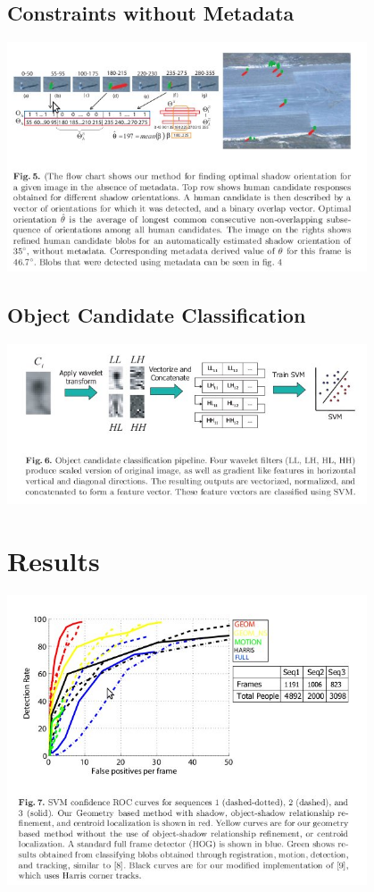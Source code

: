 \documentclass{beamer}
\begin{document}
\subsection{Constraints without Metadata}

\begin{frame}
	\includegraphics[width=0.8\textwidth]{img/fig5.jpg}
\end{frame}

\subsection{Object Candidate Classification}

\begin{frame}
	\includegraphics[width=0.8\textwidth]{img/fig6.jpg}
\end{frame}

\section{Results}

\begin{frame}
	\includegraphics[width=0.8\textwidth]{img/fig7.jpg}
\end{frame}
\end{document}

